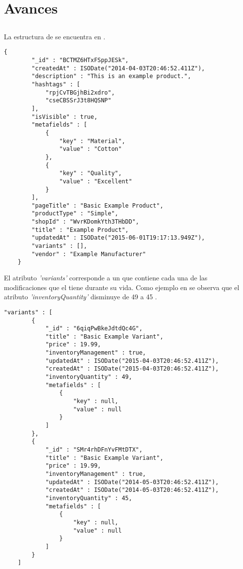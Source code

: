 \chapter{ Avances \dataModelAS }\label{ap:avance_data_model}

\section{\itemcollection}

La estructura de \itemcollection se encuentra en .

\medskip
\begin{lstlisting}[caption= \dataModelAS de \itemcollection, label=source:javascript:data_model_item]
	{
	    "_id" : "BCTMZ6HTxFSppJESk",
	    "createdAt" : ISODate("2014-04-03T20:46:52.411Z"),
	    "description" : "This is an example product.",
	    "hashtags" : [ 
	        "rpjCvTBGjhBi2xdro", 
	        "cseCBSSrJ3t8HQSNP"
	    ],
	    "isVisible" : true,
	    "metafields" : [ 
	        {
	            "key" : "Material",
	            "value" : "Cotton"
	        }, 
	        {
	            "key" : "Quality",
	            "value" : "Excellent"
	        }
	    ],
	    "pageTitle" : "Basic Example Product",
	    "productType" : "Simple",
	    "shopId" : "WvrKDomkYth3THbDD",
	    "title" : "Example Product",
	    "updatedAt" : ISODate("2015-06-01T19:17:13.949Z"),
	    "variants" : [],
	    "vendor" : "Example Manufacturer"
	}
\end{lstlisting}

El atributo \textit{'variants'} corresponde a un \arrayPL que contiene cada una de las modificaciones que el \itemCOM tiene durante su vida. Como ejemplo en  se observa que el atributo \textit{'inventoryQuantity'} disminuye de 49 a 45 \itemsCOM.

\medskip
\begin{lstlisting}[caption= El \arrayPL "variants", label=source:javascript:data_model_item_variant]
	 "variants" : [ 
        {
            "_id" : "6qiqPwBkeJdtdQc4G",
            "title" : "Basic Example Variant",
            "price" : 19.99,
            "inventoryManagement" : true,
            "updatedAt" : ISODate("2015-04-03T20:46:52.411Z"),
            "createdAt" : ISODate("2015-04-03T20:46:52.411Z"),
            "inventoryQuantity" : 49,
            "metafields" : [ 
                {
                    "key" : null,
                    "value" : null
                }
            ]
        }, 
        {
            "_id" : "SMr4rhDFnYvFMtDTX",
            "title" : "Basic Example Variant",
            "price" : 19.99,
            "inventoryManagement" : true,
            "updatedAt" : ISODate("2014-05-03T20:46:52.411Z"),
            "createdAt" : ISODate("2014-05-03T20:46:52.411Z"),
            "inventoryQuantity" : 45,
            "metafields" : [ 
                {
                    "key" : null,
                    "value" : null
                }
            ]
        }
    ]
\end{lstlisting}



